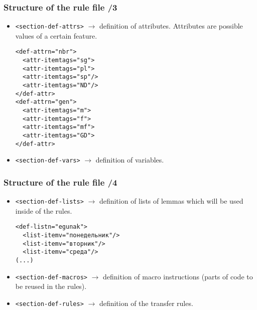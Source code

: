 \documentclass[10pt,xetex]{beamer} %
\begin{document}
\begin{frame}
\frametitle{Structure of the rule file /3}
\begin{itemize}
\item \texttt{<section-def-attrs>} $\rightarrow$ definition of attributes. Attributes are possible values of a certain feature.
\begin{exampleblock}{}
\begin{small}
\begin{alltt}
  <def-attr n="nbr">\\
  ~~<attr-item tags="sg">\\
  ~~<attr-item tags="pl">\\
  ~~<attr-item tags="sp"/>\\
  ~~<attr-item tags="ND"/>\\
  </def-attr>\\

<def-attr n="gen">\\
~~<attr-item tags="m">\\
~~<attr-item tags="f">\\
~~<attr-item tags="mf">\\
~~<attr-item tags="GD">\\
</def-attr>\\
\end{alltt}
\end{small}
\end{exampleblock}

 \item \texttt{<section-def-vars>} $\rightarrow$ definition of variables.

\end{itemize}
\end{frame}

\begin{frame}
\frametitle{Structure of the rule file /4}
\begin{itemize}
 \item \texttt{<section-def-lists>} $\rightarrow$ definition of lists of lemmas which will be used inside of the rules.
\begin{exampleblock}{}
\begin{small}
\begin{alltt}
  <def-list n="egunak">\\
  ~~ <list-item v="понедельник"/>\\
  ~~ <list-item v="вторник"/> \\
  ~~ <list-item v="среда"/> \\
  (...)
\end{alltt}
\end{small}
\end{exampleblock}
 \item \texttt{<section-def-macros>} $\rightarrow$ definition of macro instructions (parts of code to be reused in the rules).
 \item \texttt{<section-def-rules>} $\rightarrow$ definition of the transfer rules.

\end{itemize}

\end{frame}
\end{document}
